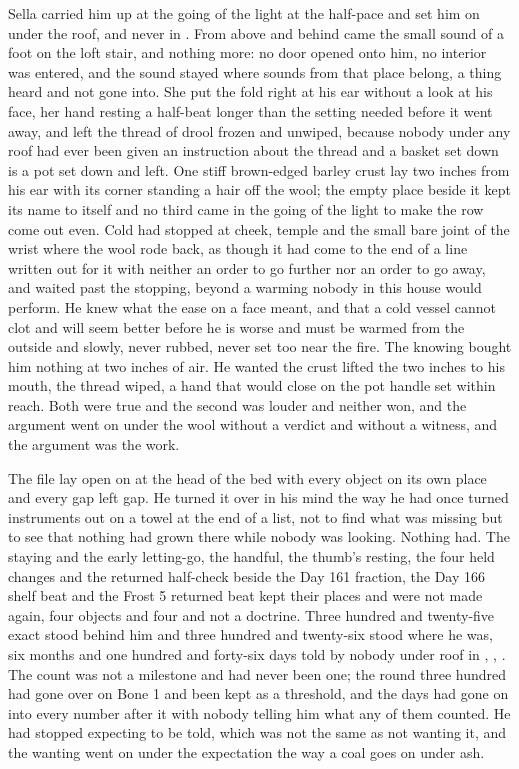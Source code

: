 Sella carried him up at the going of the light at the half-pace and set him on  under the roof, and never in . From above and behind came the small sound of a foot on the loft stair, and nothing more: no door opened onto him, no interior was entered, and the sound stayed where sounds from that place belong, a thing heard and not gone into. She put the fold right at his ear without a look at his face, her hand resting a half-beat longer than the setting needed before it went away, and left the thread of drool frozen and unwiped, because nobody under any roof had ever been given an instruction about the thread and a basket set down is a pot set down and left. One stiff brown-edged barley crust lay two inches from his ear with its corner standing a hair off the wool; the empty place beside it kept its name to itself and no third came in the going of the light to make the row come out even. Cold had stopped at cheek, temple and the small bare joint of the wrist where the wool rode back, as though it had come to the end of a line written out for it with neither an order to go further nor an order to go away, and  waited past the stopping, beyond a warming nobody in this house would perform. He knew what the ease on a face meant, and that a cold vessel cannot clot and will seem better before he is worse and must be warmed from the outside and slowly, never rubbed, never set too near the fire. The knowing bought him nothing at two inches of air. He wanted the crust lifted the two inches to his mouth, the thread wiped, a hand that would close on the pot handle set within reach. Both were true and the second was louder and neither won, and the argument went on under the wool without a verdict and without a witness, and the argument was the work.

The file lay open on  at the head of the bed with every object on its own place and every gap left gap. He turned it over in his mind the way he had once turned instruments out on a towel at the end of a list, not to find what was missing but to see that nothing had grown there while nobody was looking. Nothing had. The staying and the early letting-go, the handful, the thumb's resting, the four held changes and the returned half-check beside the Day 161 fraction, the Day 166 shelf beat and the Frost 5 returned beat kept their places and were not made again, four objects and four and not a doctrine. Three hundred and twenty-five exact stood behind him and three hundred and twenty-six stood where he was, six months and one hundred and forty-six days told by nobody under  roof in , , . The count was not a milestone and had never been one; the round three hundred had gone over on Bone 1 and been kept as a threshold, and the days had gone on into every number after it with nobody telling him what any of them counted. He had stopped expecting to be told, which was not the same as not wanting it, and the wanting went on under the expectation the way a coal goes on under ash.


